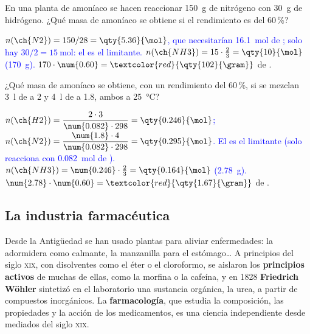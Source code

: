 \begin{exercise}
    En una planta de amoníaco se hacen reaccionar \qty{150}{\gram} de nitrógeno con \qty{30}{\gram} de hidrógeno. ¿Qué masa de
    amoníaco se obtiene si el rendimiento es del 60\,\%?
    \begin{solu}
        \textcolor{blue}{\(n(\ch{N2}) = 150/28 = \qty{5.36}{\mol}\), que necesitarían \qty{16.1}{\mol} de ; solo hay
        \(30/2 = \qty{15}{\mol}\): el  es el limitante. \(n(\ch{NH3}) = 15 \cdot \frac{2}{3} = \qty{10}{\mol}\) (\qty{170}{\gram}).}
        \(170 \cdot \num{0.60} = \textcolor{red}{\qty{102}{\gram}}\) de .
    \end{solu}
\end{exercise}

\begin{exercise}
    ¿Qué masa de amoníaco se obtiene, con un rendimiento del 60\,\%, si se mezclan \qty{3}{\litre} de  a \qty{2}{\atm} y
    \qty{4}{\litre} de  a \qty{1.8}{\atm}, ambos a \qty{25}{\degreeCelsius}?
    \begin{solu}
        \textcolor{blue}{\(n(\ch{H2}) = \dfrac{2 \cdot 3}{\num{0.082} \cdot 298} = \qty{0.246}{\mol}\);
        \(n(\ch{N2}) = \dfrac{\num{1.8} \cdot 4}{\num{0.082} \cdot 298} = \qty{0.295}{\mol}\). El  es el limitante (solo
        reacciona con \qty{0.082}{\mol} de ). \(n(\ch{NH3}) = \num{0.246} \cdot \frac{2}{3} = \qty{0.164}{\mol}\) (\qty{2.78}{\gram}).}
        \(\num{2.78} \cdot \num{0.60} = \textcolor{red}{\qty{1.67}{\gram}}\) de .
    \end{solu}
\end{exercise}

\subsection{La industria farmacéutica}

Desde la Antigüedad se han usado plantas para aliviar enfermedades: la adormidera como calmante, la manzanilla para el estómago…
A principios del siglo \textsc{xix}, con disolventes como el éter o el cloroformo, se aislaron los \textbf{principios activos} de
muchas de ellas, como la morfina o la cafeína, y en 1828 \textbf{Friedrich Wöhler} sintetizó en el laboratorio una sustancia
orgánica, la urea, a partir de compuestos inorgánicos. La \textbf{farmacología}, que estudia la composición, las propiedades y la
acción de los medicamentos, es una ciencia independiente desde mediados del siglo \textsc{xix}.

